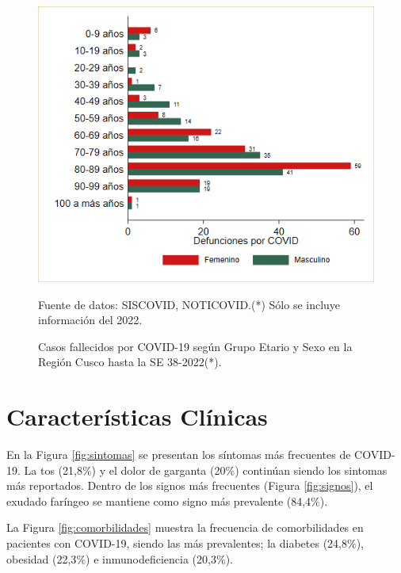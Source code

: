 \documentclass[12pt,a4paper,openany]{book}
\begin{document}
	\begin{figure}[h]
		\caption{Casos fallecidos por COVID-19 según Grupo Etario y Sexo en la Región Cusco hasta la SE 38-2022(*).}\label{fig:fallecidos_edad_sexo}
		\begin{center}
			\includegraphics[width=0.75\linewidth]{../figuras/defunciones_etapavida_2022}
		\end{center}
		{\footnotesize {Fuente de datos: SISCOVID, NOTICOVID.(*) Sólo se incluye información del 2022.}}
	\end{figure}
	
	
	
	\cleardoublepage
	
	
	\clearpage

	
	\section*{Características Clínicas}
	\noindent En la Figura \ref{fig:sintomas} se presentan los síntomas más frecuentes  de COVID-19. La tos (21,8$\%$) y el dolor de garganta (20$\%$) continúan siendo los sintomas más reportados. Dentro de los signos más frecuentes (Figura \ref{fig:signos}), el exudado faríngeo se mantiene como signo más prevalente (84,4$\%$). 
	
	\noindent La Figura \ref{fig:comorbilidades} muestra la frecuencia de comorbilidades en pacientes con COVID-19, siendo las más prevalentes; la diabetes (24,8$\%$), obesidad (22,3$\%$) e inmunodeficiencia (20,3$\%$).
	  
\end{document}
